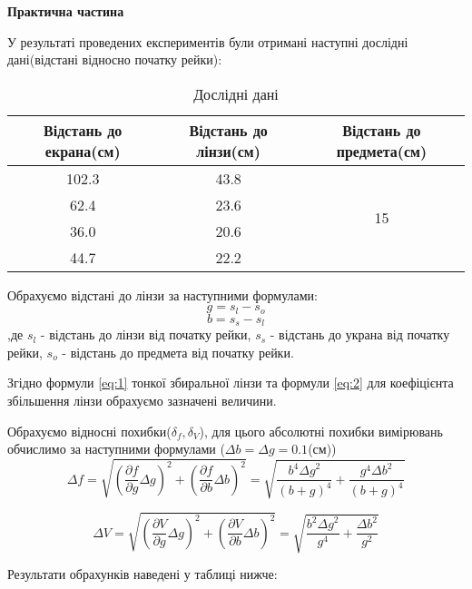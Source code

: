\begin{center}
    \Large{\textbf{Практична частина}}
\end{center}

\vspace{1mm}

У результаті проведених експериментів 
були отримані наступні дослідні дані(відстані відносно початку рейки):
\begin{table}[h] \label{table:raw}
    \centering
    \begin{tabular}{ |c|c|c| }
        \hline 
        \textbf{Відстань до екрана(см)} & \textbf{Відстань до лінзи(см)} & \textbf{Відстань до предмета(см)} \\
        \hline
        102.3 & 43.8 & \multirow{4}{*}{15} \\
        \cline{1-2}
        62.4 & 23.6 & \\
        \cline{1-2}
        36.0 & 20.6 & \\
        \cline{1-2}
        44.7 & 22.2 & \\
        \hline
    \end{tabular}
    \caption{Дослідні дані}
\end{table}


Обрахуємо відстані до лінзи за наступними формулами:
$$ g = s_l - s_o $$
$$ b = s_s - s_l $$
,де $s_l$ - відстань до лінзи від початку рейки,
$s_s$ - відстань до украна від початку рейки,
$s_o$ - відстань до предмета від початку рейки.

Згідно формули \ref{eq:1} тонкої збиральної лінзи 
та формули \ref{eq:2} для коефіцієнта збільшення лінзи обрахуємо
зазначені величини. 

Обрахуємо відносні похибки($\delta_f, \delta_V$), для цього абсолютні похибки вимірювань обчислимо за наступними формулами ($\Delta b = \Delta g = 0.1$(см))
$$ \Delta f = \sqrt{ \left( \frac{\partial{f}}{ \partial{g} } \Delta g \right)^2 +
\left( \frac{\partial{f}}{ \partial{b} } \Delta b \right)^2 } = 
\sqrt{ \frac{b^4 {\Delta g}^2}{ (b+g)^4 } + \frac{g^4 {\Delta b}^2}{ (b+g)^4 } } $$

$$ \Delta V = \sqrt{ \left( \frac{\partial{V}}{ \partial{g} } \Delta g \right)^2 +
\left( \frac{\partial{V}}{ \partial{b} } \Delta b \right)^2 } =
\sqrt{ \frac{b^2 {\Delta g}^2}{ g^4 } + \frac{{\Delta b}^2}{ g^2 } } $$

Результати обрахунків наведені у таблиці нижче:

